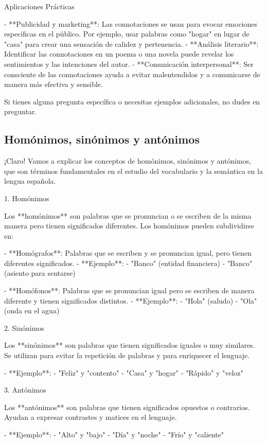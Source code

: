  Aplicaciones Prácticas

- **Publicidad y marketing**: Las connotaciones se usan para evocar emociones específicas en el público. Por ejemplo, usar palabras como "hogar" en lugar de "casa" para crear una sensación de calidez y pertenencia.
- **Análisis literario**: Identificar las connotaciones en un poema o una novela puede revelar los sentimientos y las intenciones del autor.
- **Comunicación interpersonal**: Ser consciente de las connotaciones ayuda a evitar malentendidos y a comunicarse de manera más efectiva y sensible.

Si tienes alguna pregunta específica o necesitas ejemplos adicionales, no dudes en preguntar.

\subsection{Homónimos, sinónimos y antónimos}

¡Claro! Vamos a explicar los conceptos de homónimos, sinónimos y antónimos, que son términos fundamentales en el estudio del vocabulario y la semántica en la lengua española.

1. Homónimos

Los **homónimos** son palabras que se pronuncian o se escriben de la misma manera pero tienen significados diferentes. Los homónimos pueden subdividirse en:

- **Homógrafos**: Palabras que se escriben y se pronuncian igual, pero tienen diferentes significados.
  - **Ejemplo**: 
    - "Banco" (entidad financiera)
    - "Banco" (asiento para sentarse)
  
- **Homófonos**: Palabras que se pronuncian igual pero se escriben de manera diferente y tienen significados distintos.
  - **Ejemplo**:
    - "Hola" (saludo)
    - "Ola" (onda en el agua)

2. Sinónimos

Los **sinónimos** son palabras que tienen significados iguales o muy similares. Se utilizan para evitar la repetición de palabras y para enriquecer el lenguaje.

- **Ejemplo**:
  - "Feliz" y "contento"
  - "Casa" y "hogar"
  - "Rápido" y "veloz"

3. Antónimos

Los **antónimos** son palabras que tienen significados opuestos o contrarios. Ayudan a expresar contrastes y matices en el lenguaje.

- **Ejemplo**:
  - "Alto" y "bajo"
  - "Día" y "noche"
  - "Frío" y "caliente"

